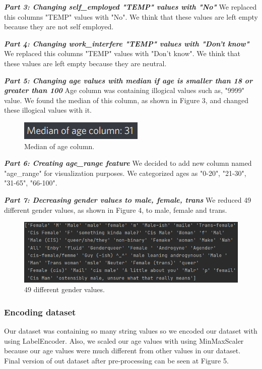 \documentclass[onecolumn]{article}
\begin{document}
\textbf{\emph{Part 3: Changing self\_employed "TEMP" values with "No"}}\bigbreak
We replaced this columns "TEMP" values with "No". We think that these values are left empty because they are not self employed.\bigbreak

\textbf{\emph{Part 4: Changing work\_interfere "TEMP" values with "Don't know"}}\bigbreak
We replaced this columns "TEMP" values with "Don't know". We think that these values are left empty because they are neutral.\bigbreak

\textbf{\emph{Part 5: Changing age values with median if age is smaller than 18 or greater than 100}}\bigbreak
Age column was containing illogical values such as, "9999" value. We found the median of this column, as shown in Figure 3, and changed these illogical values with it.\bigbreak

\begin{figure}[h]
\centering
    \includegraphics[width=.3\linewidth]{fig/fig3.png}
\caption{\label{figure3}
Median of age column.}
\end{figure}

\textbf{\emph{Part 6: Creating age\_range feature}}\bigbreak
We decided to add new column named "age\_range" for visualization purposes. We categorized ages as "0-20", "21-30", "31-65", "66-100".\bigbreak

\textbf{\emph{Part 7: Decreasing gender values to male, female, trans}}\bigbreak
We reduced 49 different gender values, as shown in Figure 4, to male, female and trans.\bigbreak

\begin{figure}[h]
\centering
    \includegraphics[width=.7\linewidth]{fig/fig4.png}
\caption{\label{figure4}
49 different gender values.}
\end{figure}

\subsubsection{Encoding dataset}
Our dataset was containing so many string values so we encoded our dataset with using LabelEncoder. Also, we scaled our age values with using MinMaxScaler because our age values were much different from other values in our dataset. Final version of out dataset after pre-processing can be seen at Figure 5.
\end{document}
